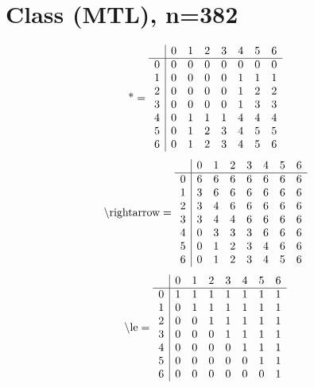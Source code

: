 \documentclass[11pt]{article}
\begin{document}
\section{Class (MTL), n=382}
\[\text{*} = 
\begin{array}{r | r r r r r r r}
 & 0 & 1 & 2 & 3 & 4 & 5 & 6 \\ \hline
0 & 0 & 0 & 0 & 0 & 0 & 0 & 0 \\
1 & 0 & 0 & 0 & 0 & 1 & 1 & 1 \\
2 & 0 & 0 & 0 & 0 & 1 & 2 & 2 \\
3 & 0 & 0 & 0 & 0 & 1 & 3 & 3 \\
4 & 0 & 1 & 1 & 1 & 4 & 4 & 4 \\
5 & 0 & 1 & 2 & 3 & 4 & 5 & 5 \\
6 & 0 & 1 & 2 & 3 & 4 & 5 & 6 \\
\end{array}
\]
\[\text{\textbackslash rightarrow} = 
\begin{array}{r | r r r r r r r}
 & 0 & 1 & 2 & 3 & 4 & 5 & 6 \\ \hline
0 & 6 & 6 & 6 & 6 & 6 & 6 & 6 \\
1 & 3 & 6 & 6 & 6 & 6 & 6 & 6 \\
2 & 3 & 4 & 6 & 6 & 6 & 6 & 6 \\
3 & 3 & 4 & 4 & 6 & 6 & 6 & 6 \\
4 & 0 & 3 & 3 & 3 & 6 & 6 & 6 \\
5 & 0 & 1 & 2 & 3 & 4 & 6 & 6 \\
6 & 0 & 1 & 2 & 3 & 4 & 5 & 6 \\
\end{array}
\]
\[\text{\textbackslash le} = 
\begin{array}{r | r r r r r r r}
 & 0 & 1 & 2 & 3 & 4 & 5 & 6 \\ \hline
0 & 1 & 1 & 1 & 1 & 1 & 1 & 1 \\
1 & 0 & 1 & 1 & 1 & 1 & 1 & 1 \\
2 & 0 & 0 & 1 & 1 & 1 & 1 & 1 \\
3 & 0 & 0 & 0 & 1 & 1 & 1 & 1 \\
4 & 0 & 0 & 0 & 0 & 1 & 1 & 1 \\
5 & 0 & 0 & 0 & 0 & 0 & 1 & 1 \\
6 & 0 & 0 & 0 & 0 & 0 & 0 & 1 \\
\end{array}
\]
\end{document}
